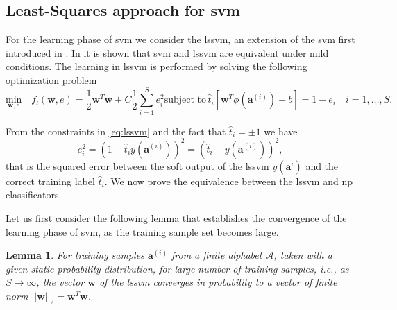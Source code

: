 \documentclass[draftcls,onecolumn,12pt]{IEEEtran}
\newtheorem{lemma}{Lemma}
\begin{document}
\subsection{Least-Squares approach for \ac{svm}}
For the learning phase of \ac{svm} we consider the \ac{lssvm}, an extension of the \ac{svm} first introduced in \cite{Suykens1999}. In \cite{Yevs} it is shown that  \ac{svm} and \ac{lssvm} are equivalent under mild conditions. The learning in \ac{lssvm} is performed by solving the following optimization problem
\begin{subequations}
	\label{eq:lssvm}
	\begin{equation}
	\label{eq:lssvmOrig}
	\underset{\mathbf{w},e}{\text{min}} \quad f_l(\mathbf{w},e) = \frac{1}{2} \mathbf{w}^T \mathbf{w} + C \frac{1}{2} \sum_{i=1}^S e_i ^2 
	\end{equation}
	\begin{equation}
	\label{eq:stpart}
	\text{subject to}\,  \hat{t}_i[\mathbf{w}^T \phi (\mathbf{a}^{(i)}) + b] = 1- e_i\quad i = 1 ,\dots,S.
	\end{equation}
\end{subequations}

From the constraints in \eqref{eq:lssvm} and the fact that $\hat{t}_i = \pm 1$ we have
\begin{equation}
\label{eq:els}
e_i^2 = (1 - \hat{t}_iy(\mathbf{a}^{(i)}) )^2 = (\hat{t}_i - y(\mathbf{a}^{(i)}))^2,
\end{equation}
that is the squared error between the soft output of the \ac{lssvm} $y(\mathbf{a}^i)$ and the correct training label $\hat{t}_i$. We now prove the equivalence between the \ac{lssvm} and \ac{np} classificators. 

Let us first consider the following lemma that establishes the convergence of the learning phase of \ac{svm}, as the training sample set becomes large.

\begin{lemma}
	\label{lem:lem1}
	For training samples $\bm{a}^{(i)}$ from a finite alphabet $\mathcal A$, taken with a given static probability distribution, for large number of training samples, i.e., as $S \rightarrow \infty$, the vector $\bm{w}$ of the \ac{lssvm} converges in probability to a vector of finite norm $||\mathbf{w}||_2 = \mathbf{w}^T\mathbf{w}$.
\end{lemma}
\end{document}
